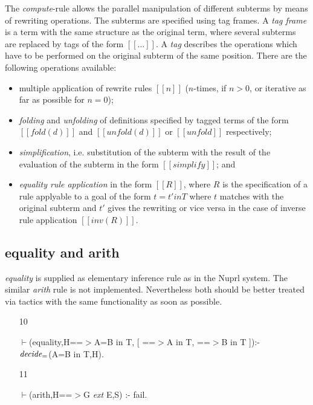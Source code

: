 \documentclass[11pt]{report}
\begin{document}
\begin{enumerate}
 The \emph{compute}-rule allows the parallel manipulation of
 different subterms by means of rewriting operations. The subterms
 are specified using tag frames. A \emph{tag frame} is a term with the
 same structure as the original term, where several subterms
 are replaced by tags of the form $[[...]]$. A \emph{tag} describes
 the operations which have to be performed on the original subterm of
 the same position. There are the following operations available:
 \begin{itemize}
 \item
 multiple application of rewrite rules $[[n]]$ ($n$-times, 
 if $n$$>$$0$, or iterative as far as possible for $n=0$);
 \item
 \emph{folding} and \emph{unfolding} of definitions specified by
 tagged terms of the form
 $[[fold(d)]]$ and $[[unfold(d)]]$ or $[[unfold]]$ respectively;
 \item 
 \emph{simplification}, i.e. substitution of the subterm with
 the result of the evaluation of the subterm in the form
 $[[simplify]]$; and
 \item
 \emph{equality rule application} in the form $[[R]]$,
 where $R$ is the specification of a rule applyable to a
 goal of the form $t=t' in T$ where $t$ matches with the
 original subterm and $t'$ gives the rewriting or vice versa
 in the case of inverse rule application $[[inv(R)]]$.
 \end{itemize}
 \end{enumerate}
  
 \subsection{equality and arith}
 \emph{equality} is supplied as elementary
 inference rule as in the Nuprl system. The similar \emph{arith}
 rule is not implemented. Nevertheless both
 should be better treated via tactics with the same functionality
 as soon as possible.
 
 \begin{enumerate}
 \item[10]
\begin{sf}\begin{tabbing}
$\vdash$(equality,H==$>$A=B in T, [ ==$>$A in T, ==$>$B in T ]):-\\[-0.15ex]
\hspace{1em}${\it decide}_{=}$(A=B in T,H).
\end{tabbing}\end{sf}

 \item[11]
\begin{sf}\begin{tabbing}
$\vdash$(arith,H==$>$G \mbox{\it ext} E,S) :- fail.
\end{tabbing}\end{sf}

 \end{enumerate}
\end{document}
